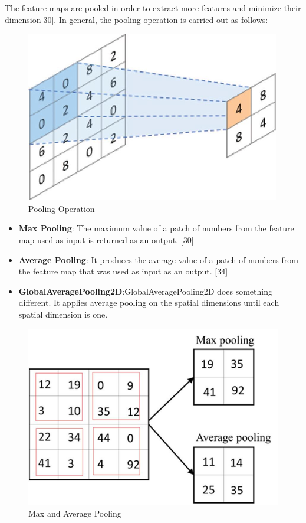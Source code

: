 \vspace{5mm}
The feature maps are pooled in order to extract more features and minimize their dimension[30]. In general, the pooling operation is carried out as follows:

\vspace{5mm}
\begin{figure}[hbt!]
\centering
\includegraphics[scale=1]{images/fig-20.png}
\caption{Pooling Operation}
\label{fig:x Pooling Operation}
\end{figure}

\vspace{5mm}
\begin{itemize}
    \item \textbf{Max Pooling}: The maximum value of a patch of numbers from the feature map used as input is returned as an output. [30]
    \item \textbf{Average Pooling}: It produces the average value of a patch of numbers from the feature map that was used as input as an output. [34]
    \item \textbf{GlobalAveragePooling2D}:GlobalAveragePooling2D does something different. It applies average pooling on the spatial dimensions until each spatial dimension is one.
\end{itemize}

\vspace{5mm}
\begin{figure}[hbt!]
\centering
\includegraphics[scale=1]{images/fig-21.png}
\caption{Max and Average Pooling}
\label{fig:x Max and Average Pooling}
\end{figure}

